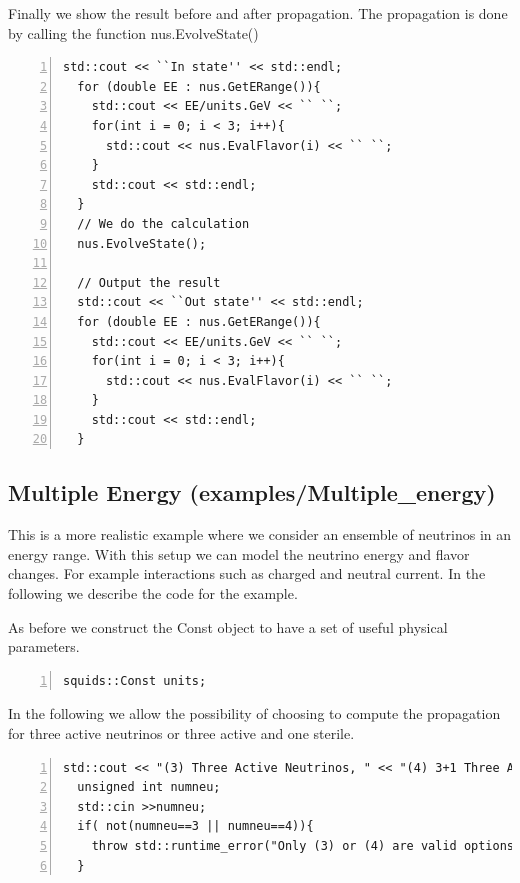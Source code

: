 \documentclass[3p,12pt]{elsarticle}
\newcommand{\ttf}{\ttfamily}
\begin{document}
Finally we show the result before and after propagation. The
propagation is done by calling the function {\ttf nus.EvolveState()}

\begin{lstlisting}[frame=leftline, numbers = left,breaklines=true, label = ex:sin1,firstnumber=last]
  std::cout << ``In state'' << std::endl;
  for (double EE : nus.GetERange()){
    std::cout << EE/units.GeV << `` ``;
    for(int i = 0; i < 3; i++){
      std::cout << nus.EvalFlavor(i) << `` ``;
    }
    std::cout << std::endl;
  }
  // We do the calculation                                                                                  
  nus.EvolveState();
  
  // Output the result                                                                                 
  std::cout << ``Out state'' << std::endl;
  for (double EE : nus.GetERange()){
    std::cout << EE/units.GeV << `` ``;
    for(int i = 0; i < 3; i++){
      std::cout << nus.EvalFlavor(i) << `` ``;
    }
    std::cout << std::endl;
  }
\end{lstlisting}


\subsection{Multiple Energy \textnormal{({\ttf examples/Multiple\_energy})}}
This is a more realistic example where we consider an ensemble of
neutrinos in an energy range. With this setup
we can model the neutrino energy and flavor changes.
For example interactions such as charged and neutral current.
In the following we describe the code for the example.

As before we construct the Const object to have a set of useful physical parameters.
\begin{lstlisting}[frame=leftline, numbers = left,breaklines=true, label = ex:sin1,firstnumber=last]
  squids::Const units;
\end{lstlisting}

In the following we allow the possibility of choosing to compute
the propagation for three active neutrinos or three active and one sterile.

\begin{lstlisting}[frame=leftline, numbers = left,breaklines=true, label = ex:sin1,firstnumber=last]
  std::cout << "(3) Three Active Neutrinos, " << "(4) 3+1 Three Active and One Sterile Neutrino" << std::endl;
  unsigned int numneu;
  std::cin >>numneu;
  if( not(numneu==3 || numneu==4)){
    throw std::runtime_error("Only (3) or (4) are valid options");
  }
\end{lstlisting}
\end{document}
